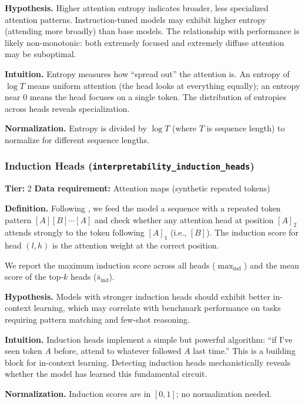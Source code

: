 \documentclass[preprint]{neurips_2025}
\begin{document}
\textbf{Hypothesis.}
Higher attention entropy indicates broader, less specialized attention patterns. Instruction-tuned models may exhibit higher entropy (attending more broadly) than base models. The relationship with performance is likely non-monotonic: both extremely focused and extremely diffuse attention may be suboptimal.

\textbf{Intuition.}
Entropy measures how ``spread out'' the attention is. An entropy of $\log T$ means uniform attention (the head looks at everything equally); an entropy near 0 means the head focuses on a single token. The distribution of entropies across heads reveals specialization.

\textbf{Normalization.} Entropy is divided by $\log T$ (where $T$ is sequence length) to normalize for different sequence lengths.

\subsubsection{Induction Heads (\texttt{interpretability\_induction\_heads})}
\label{app:induction}

\textbf{Tier:} 2 \quad \textbf{Data requirement:} Attention maps (synthetic repeated tokens)

\textbf{Definition.}
Following \citet{olsson2022context}, we feed the model a sequence with a repeated token pattern $[A] [B] \cdots [A]$ and check whether any attention head at position $[A]_2$ attends strongly to the token following $[A]_1$ (i.e., $[B]$). The induction score for head $(l, h)$ is the attention weight at the correct position.

We report the maximum induction score across all heads ($\max_{\text{ind}}$) and the mean score of the top-$k$ heads ($\bar{s}_{\text{ind}}$).

\textbf{Hypothesis.}
Models with stronger induction heads should exhibit better in-context learning, which may correlate with benchmark performance on tasks requiring pattern matching and few-shot reasoning.

\textbf{Intuition.}
Induction heads implement a simple but powerful algorithm: ``if I've seen token $A$ before, attend to whatever followed $A$ last time.'' This is a building block for in-context learning. Detecting induction heads mechanistically reveals whether the model has learned this fundamental circuit.

\textbf{Normalization.} Induction scores are in $[0, 1]$; no normalization needed.
\end{document}
